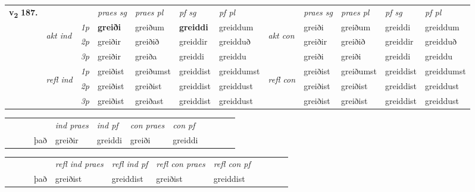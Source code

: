 \begin{tabular}{llllllllllll} \toprule
\multirow{4}{*}{{{\textbf{v{\textsubscript{2}}} \Large{\textbf{187.}}}}}  & &   &  \textit{praes sg}  & \textit{praes pl}  &\textit{ pf sg} & \textit{pf pl} &  &  \textit{praes sg}  & \textit{praes pl}  & \textit{pf sg} & \textit{pf pl } \\*
	\cmidrule{4-7} \cmidrule{9-12}
 & \multirow{3}{*}{\begin{turn}{90}\textit{akt ind}\end{turn}} & {\textit{1p}} & \textbf{greiði} & greiðum    & \textbf{greiddi} & greiddum & \multirow{3}{*}{\begin{turn}{90}\textit{akt con}\end{turn}} &greiði & greiðum & greiddi & greiddum\\*
& &  {\textit{2p}} &  greiðir  & greiðið   & greiddir & greidduð & & greiðir & greiðið & greiddir & greidduð \\*
& &  {\textit{3p}} & greiðir & greiða   & greiddi & greiddu & & greiði & greiði& greiddi & greiddu  \\*
\cmidrule{4-7} \cmidrule{9-12}
 &\multirow{3}{*}{\begin{turn}{90}\textit{refl ind}\end{turn}} & {\textit{1p}} & greiðist & greiðumst    & greiddist & greiddumst & \multirow{3}{*}{\begin{turn}{90}\textit{refl con}\end{turn}}  &greiðist & greiðumst & greiddist & greiddumst\\*
 &&  {\textit{2p}} &  greiðist  & greiðist   & greiddist & greiddust & &greiðist & greiðist & greiddist & greiddust \\*
& &  {\textit{3p}} & greiðist & greiðast   & greiddist & greiddust & & greiðist & greiðist& greiddist & greiddust  \\*
\cmidrule{4-7} \cmidrule{9-12}
\end{tabular}


\begin{tabular}{llllllllllll}
 & &  & &  \textit{ind praes} & \textit{ind pf} & \textit{con praes} & \textit{con pf} \\*
&  & & það & greiðir & greiddi & greiði & greiddi \\*
\cmidrule{5-9}
\end{tabular}


\begin{tabular}{llllllllllll}
 & &  & &  \textit{refl ind praes} & \textit{refl ind pf} & \textit{refl con praes} & \textit{refl con pf} \\*
 & &  & það & greiðist & greiddist & greiðist & greiddist \\*
\cmidrule{5-9}
\end{tabular}


